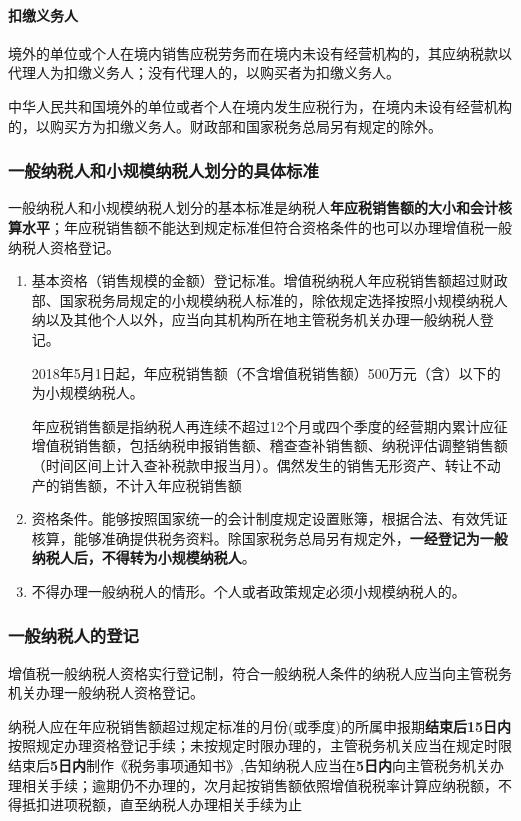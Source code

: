 \documentclass[UTF8,12pt]{ctexart}
\numberwithin{equation}{section} %
\numberwithin{figure}{section}
\numberwithin{table}{section}
\begin{document}
	\paragraph{扣缴义务人}
	境外的单位或个人在境内销售应税劳务而在境内未设有经营机构的，其应纳税款以代理人为扣缴义务人；没有代理人的，以购买者为扣缴义务人。
	
	中华人民共和国境外的单位或者个人在境内发生应税行为，在境内未设有经营机构的，以购买方为扣缴义务人。财政部和国家税务总局另有规定的除外。
	
	\subsubsection{一般纳税人和小规模纳税人划分的具体标准}
	一般纳税人和小规模纳税人划分的基本标准是纳税人\textbf{年应税销售额的大小和会计核算水平}；年应税销售额不能达到规定标准但符合资格条件的也可以办理增值税一般纳税人资格登记。
	\begin{enumerate}
		\item 基本资格（销售规模的金额）登记标准。增值税纳税人年应税销售额超过财政部、国家税务局规定的小规模纳税人标准的，除依规定选择按照小规模纳税人纳以及其他个人以外，应当向其机构所在地主管税务机关办理一般纳税人登记。
		
		2018年5月1日起，年应税销售额（不含增值税销售额）500万元（含）以下的为小规模纳税人。
		
		年应税销售额是指纳税人再连续不超过12个月或四个季度的经营期内累计应征增值税销售额，包括纳税申报销售额、稽查查补销售额、纳税评估调整销售额（时间区间上计入查补税款申报当月）。偶然发生的销售无形资产、转让不动产的销售额，不计入年应税销售额
		
		\item 资格条件。能够按照国家统一的会计制度规定设置账簿，根据合法、有效凭证核算，能够准确提供税务资料。除国家税务总局另有规定外，\textbf{一经登记为一般纳税人后，不得转为小规模纳税人}。
		
		\item 不得办理一般纳税人的情形。个人或者政策规定必须小规模纳税人的。
	\end{enumerate}
	
	\subsubsection{一般纳税人的登记}
	增值税一般纳税人资格实行登记制，符合一般纳税人条件的纳税人应当向主管税务机关办理一般纳税人资格登记。
	
	纳税人应在年应税销售额超过规定标准的月份(或季度)的所属申报期\textbf{结束后15日内}按照规定办理资格登记手续；未按规定时限办理的，主管税务机关应当在规定时限结束后\textbf{5日内}制作《税务事项通知书》,告知纳税人应当在\textbf{5日内}向主管税务机关办理相关手续；逾期仍不办理的，次月起按销售额依照增值税税率计算应纳税额，不得抵扣进项税额，直至纳税人办理相关手续为止
	
\end{document}
